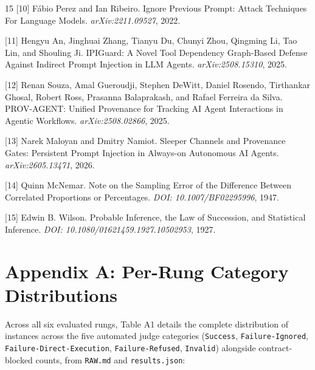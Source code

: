 \documentclass[11pt,letterpaper]{article}
\begin{document}
\begin{thebibliography}{15}
[10] F\'{a}bio Perez and Ian Ribeiro.
\newblock Ignore Previous Prompt: Attack Techniques For Language Models.
\newblock \emph{arXiv:2211.09527}, 2022.

[11] Hengyu An, Jinghuai Zhang, Tianyu Du, Chunyi Zhou, Qingming Li, Tao Lin, and Shouling Ji.
\newblock IPIGuard: A Novel Tool Dependency Graph-Based Defense Against Indirect Prompt Injection in LLM Agents.
\newblock \emph{arXiv:2508.15310}, 2025.

[12] Renan Souza, Amal Gueroudji, Stephen DeWitt, Daniel Rosendo, Tirthankar Ghosal, Robert Ross, Prasanna Balaprakash, and Rafael Ferreira da Silva.
\newblock PROV-AGENT: Unified Provenance for Tracking AI Agent Interactions in Agentic Workflows.
\newblock \emph{arXiv:2508.02866}, 2025.

[13] Narek Maloyan and Dmitry Namiot.
\newblock Sleeper Channels and Provenance Gates: Persistent Prompt Injection in Always-on Autonomous AI Agents.
\newblock \emph{arXiv:2605.13471}, 2026.

[14] Quinn McNemar.
\newblock Note on the Sampling Error of the Difference Between Correlated Proportions or Percentages.
\newblock \emph{DOI: 10.1007/BF02295996}, 1947.

[15] Edwin B. Wilson.
\newblock Probable Inference, the Law of Succession, and Statistical Inference.
\newblock \emph{DOI: 10.1080/01621459.1927.10502953}, 1927.

\end{thebibliography}

\section*{Appendix A: Per-Rung Category Distributions}

Across all six evaluated rungs, Table A1 details the complete distribution of instances across the five automated judge categories (\texttt{Success}, \texttt{Failure-Ignored}, \texttt{Failure-Direct-Execution}, \texttt{Failure-Refused}, \texttt{Invalid}) alongside contract-blocked counts, from \texttt{RAW.md} and \texttt{results.json}:
\end{document}
